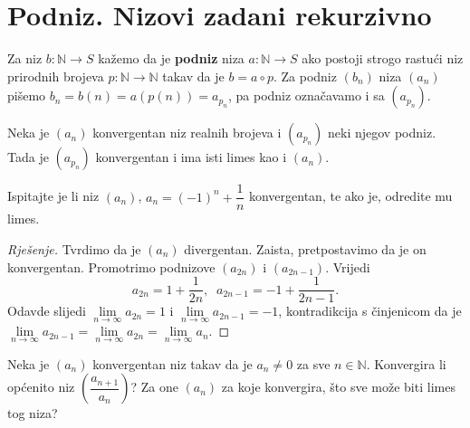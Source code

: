 \section{Podniz. Nizovi zadani rekurzivno}
\begin{definition}
Za niz $b : \mathbb{N}\to S$ kažemo da je \textbf{podniz} niza $a :\mathbb{N}\to S$ ako postoji strogo rastući niz prirodnih brojeva $p : \mathbb{N}\to \mathbb{N}$ takav da je $b=a\circ p$. Za podniz $(b_n)$ niza $(a_n)$ pišemo $b_n=b(n)=a\left(p(n)\right)=a_{p_n}$, pa podniz označavamo i sa $(a_{p_n})$.
\end{definition}
\begin{remark}
\label{onsubsequences}
Neka je $(a_n)$ konvergentan niz realnih brojeva i $(a_{p_n})$ neki njegov podniz. Tada je $(a_{p_n})$ konvergentan i ima isti limes kao i $(a_n)$.
\end{remark}
\begin{exercise}
Ispitajte je li niz $(a_n)$, $a_n=(-1)^n+\dfrac{1}{n}$ konvergentan, te ako je, odredite mu limes.
\end{exercise}
\begin{proof}[Rješenje]
Tvrdimo da je $(a_n)$ divergentan. Zaista, pretpostavimo da je on konvergentan. Promotrimo podnizove $(a_{2n})$ i $(a_{2n-1})$. Vrijedi
$$a_{2n}=1+\dfrac{1}{2n},\;\;
a_{2n-1}=-1+\dfrac{1}{2n-1}.$$
Odavde slijedi $\lim\limits_{n\to \infty}{a_{2n}}=1$ i $\lim\limits_{n\to \infty}{a_{2n-1}}=-1$, kontradikcija s činjenicom da je $\lim\limits_{n\to \infty}{a_{2n-1}}=\lim\limits_{n\to \infty}{a_{2n}}=\lim\limits_{n\to \infty}{a_{n}}$.
\end{proof}
\begin{exercise}
Neka je $(a_n)$ konvergentan niz takav da je $a_n\neq 0$ za sve $n\in \mathbb{N}$. Konvergira li općenito niz $\left(\dfrac{a_{n+1}}{a_n}\right)$? Za one $(a_n)$ za koje konvergira, što sve može biti limes tog niza?
\end{exercise}
